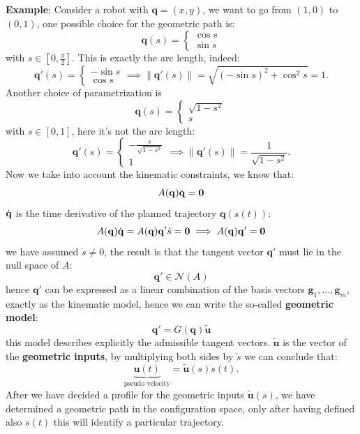 \documentclass[10pt, a4paper]{report}
\newcommand{\q}{{\mathbf q}}
\begin{document}
\noindent\textbf{Example}: Consider a robot with $\q=(x,y)$, we want to go from $(1,0)$ to $(0,1)$, one possible choice for the geometric path is:\begin{equation}
    \q(s)=\begin{cases}
        \cos s\\ 
        \sin s 
    \end{cases}
\end{equation}
with $s\in\left[0,\frac{\pi}{2}\right]$. This is exactly the arc length, indeed:\begin{equation}
    \q'(s)=\begin{cases}
        -\sin s\\ 
        \cos s 
    \end{cases}\implies \| \q'(s)\|=\sqrt{(-\sin s)^2+\cos^2 s }=1.
\end{equation}
Another choice of parametrization is\begin{equation}
    \q(s)=\begin{cases}
        \sqrt{1-s^2}\\
        s
    \end{cases}
\end{equation}
with $s\in [0,1]$, here it's not the arc length:\begin{equation}
    \q'(s)=\begin{cases}
        -\frac{s}{\sqrt{1 - s^2}}
        \\ 1
    \end{cases}\implies \| \q'(s)\|= \frac{1}{\sqrt{1 - s^2}}.
\end{equation}
Now we take into account the kinematic constraints, we know that:\begin{equation}
    A(\q)\dq=\mathbf 0 
\end{equation}
${\dot{\mathbf q}}$ is the time derivative of the planned trajectory $\q(s(t))$:\begin{equation}
     A(\q)\dq=A(\q)\q'\dot s=\mathbf 0\implies A(\q)\q'=\mathbf 0  
\end{equation}
we have assumed $\dot s\ne 0$, the result is that the tangent vector $\q'$ must lie in the null space of $A$:\begin{equation}
    \q'\in \mathcal N(A )
\end{equation}
hence $\q'$ can be expressed as a linear combination of the basis vectors $\mathbf g_1,\dots, \mathbf g_m$, exactly as the kinematic model, hence we can write the so-called \textbf{geometric model}:\begin{equation}
    \q'=G(\q)\tilde{\mathbf u}
\end{equation}
this model describes explicitly the admissible tangent vectors. $\tilde{\mathbf u}$ is the vector of the \textbf{geometric inputs}, by multiplying both sides by $\dot s$ we can conclude that:\begin{equation}
   \underbrace{\mathbf u(t)}_{\text{pseudo velocity}} = \tilde{\mathbf u}(s)\dot s(t).
\end{equation}
After we have decided a profile for the geometric inputs $\tilde{\mathbf u}(s)$, we have determined a geometric path in the configuration space, only after having defined also $s(t)$ this will identify a particular trajectory.\bigskip
\end{document}
